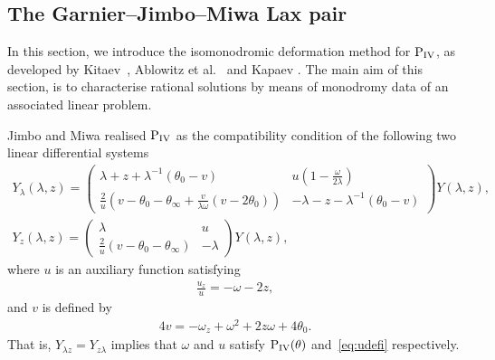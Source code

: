 \documentclass[pdftex]{sigma}
\numberwithin{equation}{section}
\newcommand{\om}{\omega}
\begin{document}
\subsection{The Garnier--Jimbo--Miwa Lax pair}\label{section:iso}
In this section, we introduce the isomonodromic deformation method for ${\rm P}_{\rm IV}$, as developed by Kitaev~\cite{kitaev1988}, Ablowitz et al.~\cite{fokasmugan1988} and Kapaev \cite{kapaev1996,kapaev1998}. The main aim of this section, is to characterise rational solutions by means of monodromy data of an associated linear problem.

Jimbo and Miwa \cite{jimbomiwaII1981} realised ${\rm P}_{\rm IV}$ as the compatibility condition of the following two linear dif\/ferential systems
\begin{subequations}\label{eq:laxpair}
	\begin{gather}
	Y_{\lambda}(\lambda,z)=
	\begin{pmatrix}\displaystyle
	\lambda+z+\lambda^{-1}(\theta_0-v) &
	u\left(1-\displaystyle\frac{\om}{2\lambda}\right) \\
	\displaystyle\frac{2}{u}\left(v-\theta_0-\theta_\infty+\displaystyle\frac{v}{\lambda \om}(v-2\theta_0)\right)&
	-\lambda-z-\lambda^{-1}(\theta_0-v)
	\end{pmatrix}
	Y(\lambda,z),\label{eq:1isopiv}\\
	Y_{z}(\lambda,z)=
	\begin{pmatrix}\displaystyle
	\lambda &
	u \\
	\displaystyle\frac{2}{u}\left(v-\theta_0-\theta_\infty\right)&
	-\lambda
	\end{pmatrix}
	Y(\lambda,z), \label{eq:1isopivdeformation}
	\end{gather}
\end{subequations}
where $u$ is an auxiliary function satisfying
\begin{gather}\label{eq:udefi}
\frac{u_z}{u}=-\om-2z,
\end{gather}
and $v$ is def\/ined by
\begin{gather*}
4v=-\om_z+\om^2+2z\om+4\theta_0.
\end{gather*}
That is, $Y_{\lambda z}=Y_{z\lambda}$ implies that $\om$ and $u$ satisfy ${\rm P}_{\rm IV}(\theta)$ and~\eqref{eq:udefi} respectively.
\end{document}

